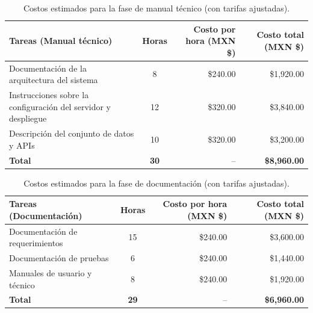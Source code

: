 \begin{table}[H]
	\centering
	\renewcommand{\arraystretch}{1.6}
	\setlength{\tabcolsep}{10pt}
	\Huge
	\begin{adjustbox}{max width=\textwidth}
		\begin{tabular}{|p{9.5cm}|c|r|r|}
			\hline
			\textbf{Tareas (Manual técnico)} & \textbf{Horas} & \textbf{Costo por hora (MXN \$)} & \textbf{Costo total (MXN \$)} \\ \hline
			Documentación de la arquitectura del sistema & 8 & \$240.00 & \$1,920.00 \\ \hline
			Instrucciones sobre la configuración del servidor y despliegue & 12 & \$320.00 & \$3,840.00 \\ \hline
			Descripción del conjunto de datos y APIs & 10 & \$320.00 & \$3,200.00 \\ \hline
			\textbf{Total} & \textbf{30} & -- & \textbf{\$8,960.00} \\ \hline
		\end{tabular}
	\end{adjustbox}
	\caption{Costos estimados para la fase de manual técnico (con tarifas ajustadas).}
	\label{tab:costos_manual_tecnico_actualizado}
\end{table}

\begin{table}[H]
	\centering
	\renewcommand{\arraystretch}{1.6}
	\setlength{\tabcolsep}{10pt}
	\Huge
	\begin{adjustbox}{max width=\textwidth}
		\begin{tabular}{|p{9.5cm}|c|r|r|}
			\hline
			\textbf{Tareas (Documentación)} & \textbf{Horas} & \textbf{Costo por hora (MXN \$)} & \textbf{Costo total (MXN \$)} \\ \hline
			Documentación de requerimientos & 15 & \$240.00 & \$3,600.00 \\ \hline
			Documentación de pruebas & 6 & \$240.00 & \$1,440.00 \\ \hline
			Manuales de usuario y técnico & 8 & \$240.00 & \$1,920.00 \\ \hline
			\textbf{Total} & \textbf{29} & -- & \textbf{\$6,960.00} \\ \hline
		\end{tabular}
	\end{adjustbox}
	\caption{Costos estimados para la fase de documentación (con tarifas ajustadas).}
	\label{tab:costos_documentacion_actualizado}
\end{table}


